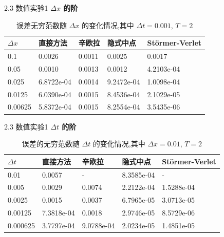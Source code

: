\documentclass{beamer}
\begin{document}
\begin{frame}{2.3 数值实验1}
\textbf{$\Delta x$ 的阶}
\begin{table}[h]
  \centering
\caption{误差无穷范数随 $\Delta x$ 的变化情况,其中 $\Delta t=0.001$, $T=2$}
\begin{tabularx}{\linewidth}{XXXXX}
 \hline
 $\Delta x$ &直接方法 & 辛欧拉 & 隐式中点 & St\"{o}rmer-Verlet\\
 \hline
 0.1 & 0.0026 & 0.0011 & 0.0025 & 0.0017\\
 0.05 & 0.0010 & 0.0013 & 0.0012 & 4.2103e-04\\
 0.025 & 6.8722e-04 & 0.0014 & 9.2472e-04 & 1.0098e-04\\
 0.0125 & 6.0390e-04 & 0.0015 & 8.4536e-04 & 2.1029e-05\\
 0.00625 & 5.8372e-04 & 0.0015 & 8.2554e-04 & 3.5435e-06\\
 \hline
\end{tabularx}
  \label{tab:dx1}
\end{table}
\end{frame}

\begin{frame}{2.3 数值实验1}
\textbf{$\Delta t$ 的阶}

\begin{table}[h]
  \centering
\caption{误差的无穷范数随 $\Delta t$ 的变化情况,其中 $\Delta x=0.01$, $T=2$}
\begin{tabularx}{\linewidth}{XXXXX}
 \hline
 $\Delta t$ &直接方法 & 辛欧拉 & 隐式中点 & St\"{o}rmer-Verlet\\
 \hline
 0.01 & 0.0057 & - & 8.3585e-04 & - \\
 0.005 & 0.0029 & 0.0074 & 2.2122e-04 & 1.5288e-04 \\
 0.0025 & 0.0015 & 0.0037 & 6.7965e-05 & 3.0713e-05 \\
 0.00125 & 7.3818e-04 & 0.0018 & 2.9746e-05 & 8.5729e-06 \\
 0.000625 & 3.7797e-04 & 9.0788e-04 & 2.0234e-05 & 1.4851e-05 \\
 \hline
\end{tabularx}
  \label{tab:dt1}
\end{table}
\end{frame}
\end{document}
